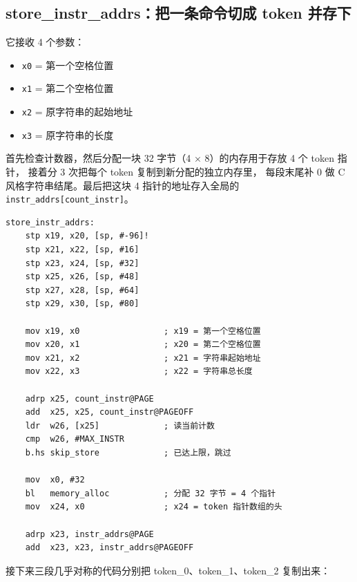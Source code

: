 \subsection{store\_instr\_addrs：把一条命令切成 token 并存下}

它接收 4 个参数：
\begin{itemize}
    \item \texttt{x0} = 第一个空格位置
    \item \texttt{x1} = 第二个空格位置
    \item \texttt{x2} = 原字符串的起始地址
    \item \texttt{x3} = 原字符串的长度
\end{itemize}

首先检查计数器，然后分配一块 32 字节（4 × 8）的内存用于存放 4 个 token 指针，
接着分 3 次把每个 token 复制到新分配的独立内存里，
每段末尾补 0 做 C 风格字符串结尾。最后把这块 4 指针的地址存入全局的
\texttt{instr\_addrs[count\_instr]}。

\begin{lstlisting}[style=asm, caption=instr.s — store\_instr\_addrs（入栈与检查）]
store_instr_addrs:
    stp x19, x20, [sp, #-96]!
    stp x21, x22, [sp, #16]
    stp x23, x24, [sp, #32]
    stp x25, x26, [sp, #48]
    stp x27, x28, [sp, #64]
    stp x29, x30, [sp, #80]

    mov x19, x0                 ; x19 = 第一个空格位置
    mov x20, x1                 ; x20 = 第二个空格位置
    mov x21, x2                 ; x21 = 字符串起始地址
    mov x22, x3                 ; x22 = 字符串总长度

    adrp x25, count_instr@PAGE
    add  x25, x25, count_instr@PAGEOFF
    ldr  w26, [x25]             ; 读当前计数
    cmp  w26, #MAX_INSTR
    b.hs skip_store             ; 已达上限，跳过

    mov  x0, #32
    bl   memory_alloc           ; 分配 32 字节 = 4 个指针
    mov  x24, x0                ; x24 = token 指针数组的头

    adrp x23, instr_addrs@PAGE
    add  x23, x23, instr_addrs@PAGEOFF
\end{lstlisting}

接下来三段几乎对称的代码分别把 token\_0、token\_1、token\_2 复制出来：

